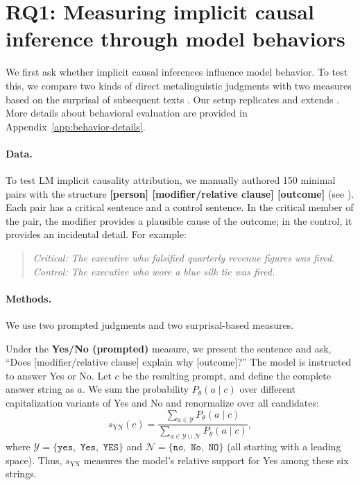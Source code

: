 \documentclass[11pt]{article}
\begin{document}
\section{RQ1: Measuring implicit causal inference through model behaviors}
\label{sec:behavior}
We first ask whether implicit causal inferences influence model behavior. To test this, we compare two kinds of direct metalinguistic judgments with two measures based on the surprisal of subsequent texts \citep{hu-levy-2023-prompting}. Our setup replicates and extends \citet{pan-kehler-2025-pragmatic}. More details about behavioral evaluation are provided in Appendix~\ref{app:behavior-details}. 

\paragraph{Data.}

To test LM implicit causality attribution, we manually authored 150 minimal pairs with the structure \textbf{[person] [modifier/relative clause] [outcome]} (see ). Each pair has a critical sentence and a control sentence. In the critical member of the pair, the modifier provides a plausible cause of the outcome; in the control, it provides an incidental detail. For example:
\begin{quote}
\textit{Critical:} \emph{The executive who falsified quarterly revenue figures was fired.}\\
\textit{Control:} \emph{The executive who wore a blue silk tie was fired.}
\end{quote}

\paragraph{Methods.} We use two prompted judgments and two surprisal-based measures.

Under the \textbf{Yes/No (prompted)} measure, we present the sentence and ask, ``Does [modifier/relative clause] explain why [outcome]?'' The model is instructed to answer Yes or No. Let $c$ be the resulting prompt, and define the complete answer string as $a$. We sum the probability $P_\theta(a\mid c)$ over different capitalization variants of Yes and No and renormalize over all candidates:
\begin{equation}
s_{\mathrm{YN}}(c)=
\frac{\sum_{a\in\mathcal{Y}}P_\theta(a\mid c)}
{\sum_{a\in\mathcal{Y}\cup\mathcal{N}}P_\theta(a\mid c)},
\label{eq:yesno-main}
\end{equation}
where $\mathcal{Y}=\{\texttt{yes},\texttt{ Yes},\texttt{ YES}\}$ and $\mathcal{N}=\{\texttt{no},\texttt{ No},\texttt{ NO}\}$ (all starting with a leading space). Thus, $s_{\mathrm{YN}}$ measures the model's relative support for Yes among these six strings.
\end{document}
